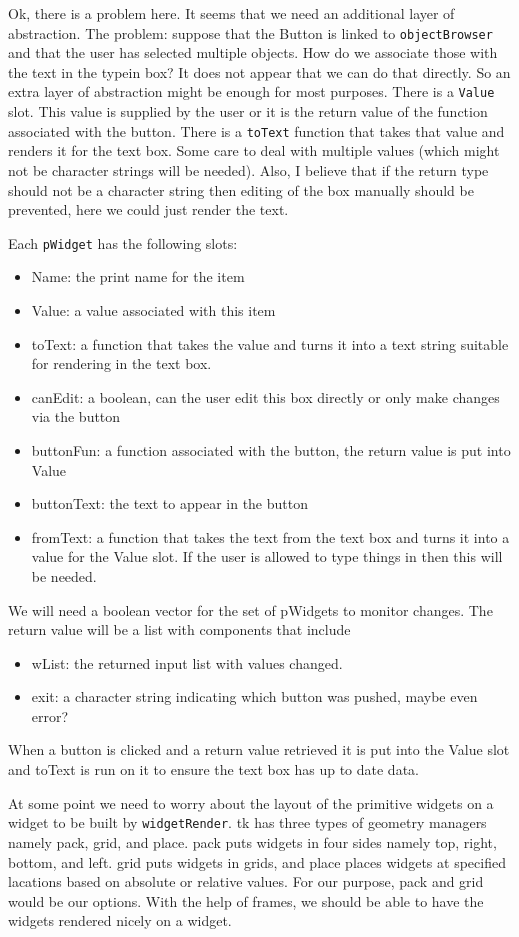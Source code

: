 \documentclass{article}
\begin{document}
Ok, there is a problem here. It seems that we need an additional layer
of abstraction. The problem: suppose that the Button is linked to
\verb+objectBrowser+ and that the user has selected multiple
objects. How do we associate those with the text in the typein box?
It does not appear that we can do that directly. So an extra layer of
abstraction might be enough for most purposes. There is a \verb+Value+
slot. This value is supplied by the user or it is the return value of
the function associated with the button. There is a \verb+toText+
function that takes that value and renders it for the text box.
Some care to deal with multiple values (which might not be character
strings will be needed). Also, I believe that if the return type
should not be a character string then editing of the box manually
should be prevented, here we could just render the text.

Each \verb+pWidget+ has the following slots:
\begin{itemize}
\item Name: the print name for the item
\item Value: a value associated with this item
\item toText: a function that takes the value and turns it into a text
  string suitable for rendering in the text box.
\item canEdit: a boolean, can the user edit this box directly or only
  make changes via the button
\item buttonFun: a function associated with the button, the return
  value is put into Value
\item buttonText: the text to appear in the button
\item fromText: a function that takes the text from the text box and
  turns it into a value for the Value slot. If the user is allowed to
  type things in then this will be needed.
\end{itemize}

We will need a boolean vector for the set of pWidgets to monitor
changes. The return value will be a list with components that include
\begin{itemize}
\item wList: the returned input list with values changed.
\item exit: a character string indicating which button was pushed,
  maybe even error?
\end{itemize}

When a button is clicked and a return value retrieved it is put into
the Value slot and toText is run on it to ensure the text box has up
to date data.

At some point we need to worry about the layout of the primitive
widgets on a widget to be built by \verb+widgetRender+. tk has three
types of geometry managers namely pack, grid, and place. pack puts
widgets in four sides namely top, right, bottom, and left. grid puts
widgets in grids, and place places widgets at specified lacations
based on absolute or relative values. For our purpose, pack and grid
would be our options. With the help of frames, we should be able to
have the widgets rendered nicely on a widget.
\end{document}
